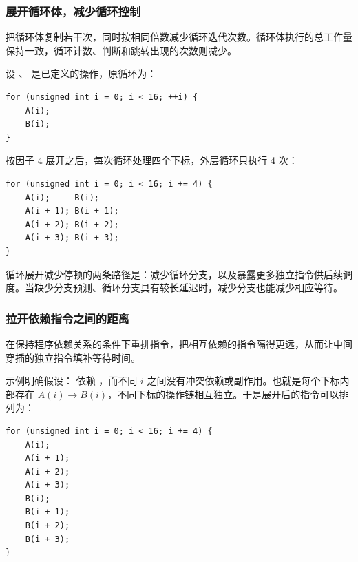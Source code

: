 \subsubsection{展开循环体，减少循环控制}
把循环体复制若干次，同时按相同倍数减少循环迭代次数。循环体执行的总工作量保持一致，循环计数、判断和跳转出现的次数则减少。

\par\noindent\begin{minipage}{\linewidth}
设 、 是已定义的操作，原循环为：

\begin{lstlisting}[caption={原始循环执行16次，每次处理一个下标。}]
for (unsigned int i = 0; i < 16; ++i) {
    A(i);
    B(i);
}
\end{lstlisting}
\end{minipage}\par

\par\noindent\begin{minipage}{\linewidth}
按因子 4 展开之后，每次循环处理四个下标，外层循环只执行 4 次：

\begin{lstlisting}[caption={按因子 4 展开的循环。}]
for (unsigned int i = 0; i < 16; i += 4) {
    A(i);     B(i);
    A(i + 1); B(i + 1);
    A(i + 2); B(i + 2);
    A(i + 3); B(i + 3);
}
\end{lstlisting}
\end{minipage}\par

循环展开减少停顿的两条路径是：减少循环分支，以及暴露更多独立指令供后续调度。当缺少分支预测、循环分支具有较长延迟时，减少分支也能减少相应等待。

\subsubsection{拉开依赖指令之间的距离}
在保持程序依赖关系的条件下重排指令，把相互依赖的指令隔得更远，从而让中间穿插的独立指令填补等待时间。

\par\noindent\begin{minipage}{\linewidth}
示例明确假设： 依赖 ，而不同 $i$ 之间没有冲突依赖或副作用。也就是每个下标内部存在 $A(i)\rightarrow B(i)$，不同下标的操作链相互独立。于是展开后的指令可以排列为：

\begin{lstlisting}[caption={在各迭代独立的前提下先安排 A，再安排依赖它们的 B。}]
for (unsigned int i = 0; i < 16; i += 4) {
    A(i);
    A(i + 1);
    A(i + 2);
    A(i + 3);
    B(i);
    B(i + 1);
    B(i + 2);
    B(i + 3);
}
\end{lstlisting}
\end{minipage}\par


